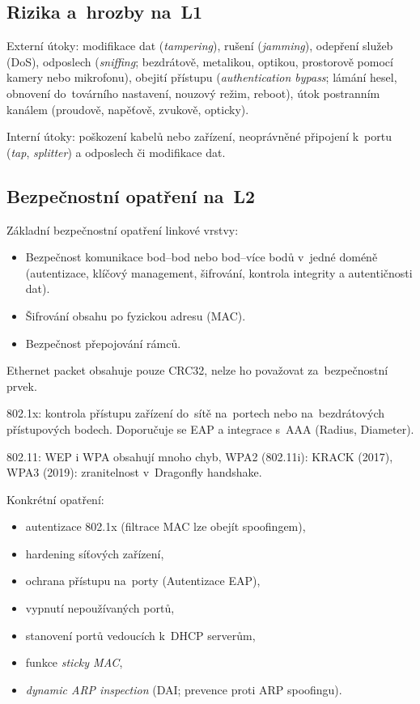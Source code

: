 \subsection{Rizika a~hrozby na~L1}

Externí útoky: modifikace dat (\emph{tampering}), rušení (\emph{jamming}), odepření služeb (DoS), odposlech (\emph{sniffing}; bezdrátově, metalikou, optikou, prostorově pomocí kamery nebo mikrofonu), obejití přístupu (\emph{authentication bypass}; lámání hesel, obnovení do~továrního nastavení, nouzový režim, reboot), útok postranním kanálem (proudově, napěťově, zvukově, opticky).

Interní útoky: poškození kabelů nebo zařízení, neoprávněné připojení k~portu (\emph{tap}, \emph{splitter}) a odposlech či modifikace dat.



\subsection{Bezpečnostní opatření na~L2}

Základní bezpečnostní opatření linkové vrstvy:
\vspace*{-0.5em}\begin{itemize}
    \item Bezpečnost komunikace bod--bod nebo bod--více bodů v~jedné doméně (autentizace, klíčový management, šifrování, kontrola integrity a autentičnosti dat).
    \item Šifrování obsahu po fyzickou adresu (MAC).
    \item Bezpečnost přepojování rámců.
\end{itemize}

Ethernet packet obsahuje pouze CRC32, nelze ho považovat za~bezpečnostní prvek.

802.1x: kontrola přístupu zařízení do~sítě na~portech nebo na~bezdrátových přístupových bodech.
Doporučuje se EAP a integrace s~AAA (Radius, Diameter).

802.11: WEP i WPA obsahují mnoho chyb, WPA2 (802.11i): KRACK (2017), WPA3 (2019): zranitelnost v~Dragonfly handshake.

Konkrétní opatření:
\vspace*{-0.5em}\begin{itemize}
    \item autentizace 802.1x (filtrace MAC lze obejít spoofingem),
    \item hardening síťových zařízení,
    \item ochrana přístupu na~porty (Autentizace EAP),
    \item vypnutí nepoužívaných portů,
    \item stanovení portů vedoucích k~DHCP serverům,
    \item funkce \emph{sticky MAC},
    \item \emph{dynamic ARP inspection} (DAI; prevence proti ARP spoofingu).
\end{itemize}

